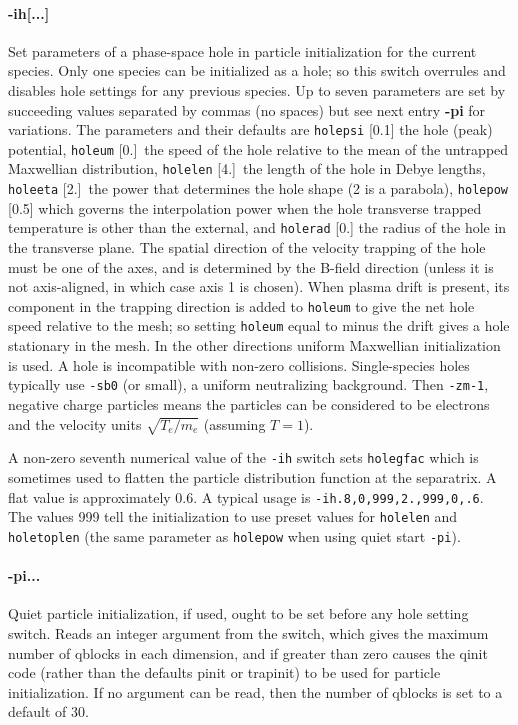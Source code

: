 \documentclass[12pt]{article}
\begin{document}
\paragraph{-ih[...]} Set parameters of a phase-space hole in particle
initialization for the current species. Only one species can be
initialized as a hole; so this switch overrules and disables hole
settings for any previous species. Up to seven parameters are set by
succeeding values separated by commas (no spaces) but see next entry
{\bf -pi} for variations. The parameters and
their defaults are \verb!holepsi! [0.1] the hole (peak) potential,
\verb!holeum! [0.]\ the speed of the hole relative to the mean of the
untrapped Maxwellian distribution, \verb!holelen! [4.]\ the length of
the hole in Debye lengths, \verb!holeeta! [2.]\ the power that
determines the hole shape (2 is a parabola), \verb!holepow! [0.5]
which governs the interpolation power when the hole transverse trapped
temperature is other than the external, and \verb!holerad! [0.] the
radius of the hole in the transverse plane.  The spatial direction of
the velocity trapping of the hole must be one of the axes, and is
determined by the B-field direction (unless it is not axis-aligned, in
which case axis 1 is chosen). When plasma drift is present, its
component in the trapping direction is added to \verb!holeum! to give
the net hole speed relative to the mesh; so setting \verb!holeum! equal to
minus the drift gives a hole stationary in the mesh.  In the other directions
uniform Maxwellian initialization is used. A hole is incompatible with
non-zero collisions. Single-species holes typically use \verb!-sb0!
(or small), a uniform neutralizing background. Then \verb!-zm-1!,
negative charge particles means the particles can be considered to be
electrons and the velocity units $\sqrt{T_e/m_e}$ (assuming $T=1$).

A non-zero seventh numerical value of the \verb!-ih! switch sets
\verb!holegfac! which is sometimes used to flatten the particle
distribution function at the separatrix. A flat value is approximately
0.6.  A typical usage is \verb!-ih.8,0,999,2.,999,0,.6!. The values
999 tell the initialization to use preset values for \verb!holelen!
and \verb!holetoplen! (the same parameter as \verb!holepow! when using
quiet start \verb!-pi!).


\paragraph{-pi...} Quiet particle initialization, if used, ought to be
set before any hole setting switch. Reads an integer
argument from the switch, which gives the maximum number of qblocks in
each dimension, and if greater than zero causes the qinit code (rather
than the defaults pinit or trapinit) to be used for particle
initialization. If no argument can be read, then the number of qblocks
is set to a default of 30. 
\end{document}
